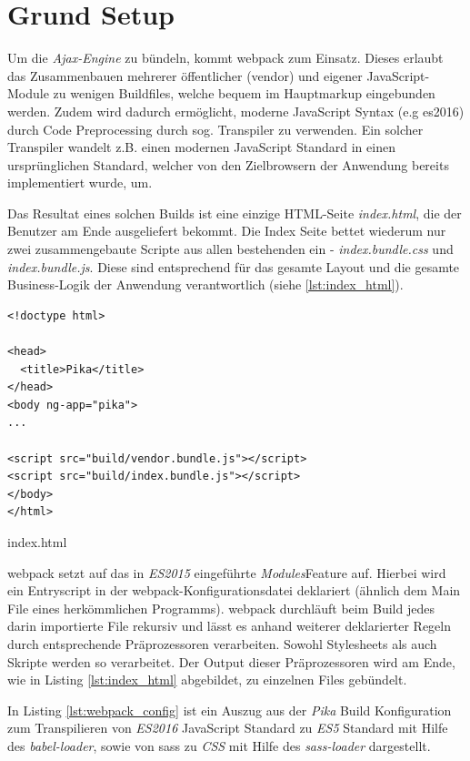 \section{Grund Setup}
\label{sec:grund_setup}

Um die \textit{Ajax-Engine} zu bündeln, kommt \gls{webpack} zum Einsatz. Dieses erlaubt das Zusammenbauen mehrerer öffentlicher (vendor) und eigener JavaScript-Module zu wenigen Buildfiles, welche bequem im Hauptmarkup eingebunden werden. Zudem wird dadurch ermöglicht, moderne JavaScript Syntax (e.g \gls{es2016}) durch Code Preprocessing durch sog. Transpiler zu verwenden. Ein solcher Transpiler wandelt z.B. einen modernen JavaScript Standard in einen ursprünglichen Standard, welcher von den Zielbrowsern der Anwendung bereits implementiert wurde, um.

Das Resultat eines solchen Builds ist eine einzige HTML-Seite \textit{index.html}, die der Benutzer am Ende ausgeliefert bekommt. Die Index Seite bettet wiederum nur zwei zusammengebaute Scripte aus allen bestehenden ein - \textit{index.bundle.css} und \textit{index.bundle.js}. Diese sind entsprechend für das gesamte Layout und die gesamte Business-Logik der Anwendung verantwortlich (siehe \ref{lst:index_html}).

\begin{listing}[H]
\begin{verbatim}
<!doctype html>

<head>
  <title>Pika</title>
</head>
<body ng-app="pika">
...

<script src="build/vendor.bundle.js"></script>
<script src="build/index.bundle.js"></script>
</body>
</html>

\end{verbatim}
\caption{index.html}
\label{lst:index_html}
\end{listing}

\gls{webpack} setzt auf das in \textit{ES2015} eingeführte \textit{Modules}Feature auf. Hierbei wird ein Entryscript in der \gls{webpack}-Konfigurationsdatei deklariert (ähnlich dem Main File eines herkömmlichen Programms). \gls{webpack} durchläuft beim Build jedes darin importierte File rekursiv und lässt es anhand weiterer deklarierter Regeln durch entsprechende Präprozessoren verarbeiten. Sowohl Stylesheets als auch Skripte werden so verarbeitet. Der Output dieser Präprozessoren wird am Ende, wie in Listing \ref{lst:index_html} abgebildet, zu einzelnen Files gebündelt.

In Listing \ref{lst:webpack_config} ist ein Auszug aus der \textit{Pika} Build Konfiguration zum Transpilieren von \textit{ES2016} JavaScript Standard zu \textit{ES5} Standard mit Hilfe des \textit{babel-loader}, sowie von \gls{sass} zu \textit{CSS} mit Hilfe des \textit{sass-loader} dargestellt.

